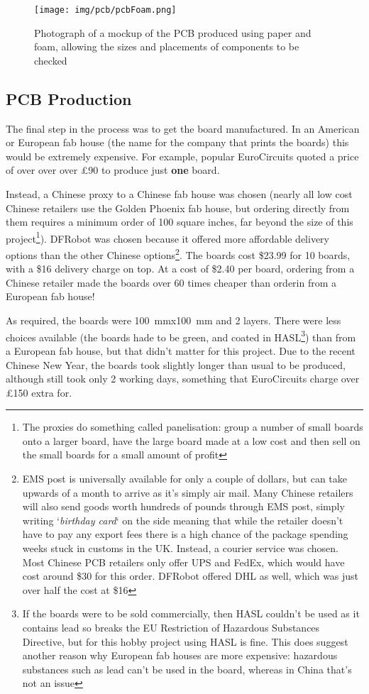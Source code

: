 \begin{figure}[H]
  \texttt{[image: img/pcb/pcbFoam.png]}
  \caption[PCB (Mockup)]{Photograph of a mockup of the PCB produced using paper and foam,
  allowing the sizes and placements of components to be checked}
  \label{fig:pcbFoam}
\end{figure}

\subsection{PCB Production}
The final step in the process was to get the board manufactured. In an American
or European fab house (the name for the company that prints the boards) this
would be extremely expensive. For example, popular EuroCircuits quoted a price
of over over over \pounds 90 to produce just \textbf{one} board.

Instead, a Chinese proxy to a Chinese fab house was chosen (nearly all low cost
Chinese retailers use the Golden Phoenix fab house, but ordering directly from
them requires a minimum order of 100 square inches, far beyond the size of this
project\footnote{The proxies do something called panelisation: group a number of
small boards onto a larger board, have the large board made at a low cost and
then sell on the small boards for a small amount of profit}). DFRobot was chosen
because it offered more affordable delivery options than the other Chinese
options\footnote{EMS post is universally available for only a couple of dollars,
  but can take upwards of a month to arrive as it's simply air mail. Many
  Chinese retailers will also send goods worth hundreds of pounds through EMS
  post, simply writing `\textit{birthday card}` on the side meaning that while
  the retailer doesn't have to pay any export fees there is a high chance of the
  package spending weeks stuck in customs in the UK. Instead, a courier service
was chosen. Most Chinese PCB retailers only offer UPS and FedEx, which would
have cost around \$30 for this order. DFRobot offered DHL as well, which was
just over half the cost at \$16}. The boards cost \$23.99 for 10 boards, with a
\$16 delivery charge on top. At a cost of \$2.40 per board, ordering from a
Chinese retailer made the boards over 60 times cheaper than orderin from a
European fab house!

As required, the boards were \SI{100}{mm}x\SI{100}{mm} and 2 layers. There were
less choices available (the boards hade to be green, and coated in
HASL\footnote{If the boards were to be sold commercially, then HASL couldn't be
  used as it contains lead so breaks the EU Restriction of Hazardous Substances
  Directive, but for this hobby project using HASL is fine. This does suggest
  another reason why European fab houses are more expensive: hazardous
  substances such as lead can't be used in the board, whereas in China that's
not an issue}) than from a European fab house, but that didn't matter for this
project. Due to the recent Chinese New Year, the boards took slightly longer
than usual to be produced, although still took only 2 working days, something
that EuroCircuits charge over \pounds 150 extra for.

